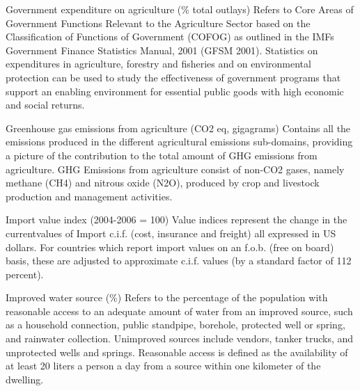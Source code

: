 \begin{MetadataCollection} {}
\begin{metadata}{Government expenditure on agriculture (\% total outlays)} {}
Refers to Core Areas of Government Functions Relevant to the Agriculture Sector based on the Classification of Functions of Government (COFOG) as outlined in the IMFs Government Finance Statistics Manual, 2001 (GFSM 2001). Statistics on expenditures in agriculture, forestry and fisheries and on environmental protection can be used to study the effectiveness of government programs that support an enabling environment for essential public goods with high economic and social returns. 
\end{metadata}

\begin{metadata}{Greenhouse gas emissions from agriculture (CO2 eq, gigagrams)} {}
Contains all the emissions produced in the different agricultural emissions sub-domains, providing a picture of the contribution to the total amount of GHG emissions from agriculture.  GHG Emissions from agriculture consist of non-CO2 gases, namely methane (CH4) and nitrous oxide (N2O), produced by crop and livestock production and management activities.
\end{metadata}

\begin{metadata}{Import value index (2004-2006 = 100)} {}
Value indices represent the change in the currentvalues of Import c.i.f. (cost, insurance and freight) all expressed in US dollars. For countries which report import values on an f.o.b. (free on board) basis, these are adjusted to approximate c.i.f. values (by a standard factor of 112 percent).
\end{metadata}

\begin{metadata}{Improved water source (\%)} {}
Refers to the percentage of the population with reasonable access to an adequate amount of water from an improved source, such as a household connection, public standpipe, borehole, protected well or spring, and rainwater collection. Unimproved sources include vendors, tanker trucks, and unprotected wells and springs. Reasonable access is defined as the availability of at least 20 liters a person a day from a source within one kilometer of the dwelling.
\end{metadata}


\end{MetadataCollection}
